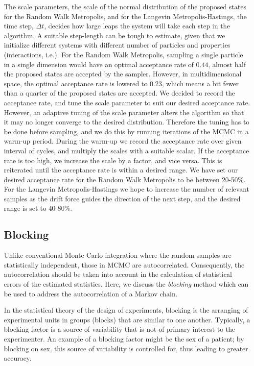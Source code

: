 The scale parameters, the scale of the normal distribution of the proposed states for the Random Walk Metropolis, and for the Langevin Metropolis-Hastings, the time step, $\Delta t$, decides how large leaps the system will take each step in the algorithm. A suitable step-length can be tough to estimate, given that we initialize different systems with different number of particles and properties (interactions, i.e.). For the Random Walk Metropolis, sampling a single particle in a single dimension would have an optimal acceptance rate of $0.44$, almost half the proposed states are accepted by the sampler. However, in multidimensional space, the optimal acceptance rate is lowered to $0.23$, which means a bit fewer than a quarter of the proposed states are accepted. We decided to record the acceptance rate, and tune the scale parameter to suit our desired acceptance rate. However, an adaptive tuning of the scale parameter alters the algorithm so that it may no longer converge to the desired distribution. Therefore the tuning has to be done before sampling, and we do this by running iterations of the MCMC in a warm-up period. During the warm-up we record the acceptance rate over given interval of cycles, and multiply the scales with a suitable scalar. If the acceptance rate is too high, we increase the scale by a factor, and vice versa. This is reiterated until the acceptance rate is within a desired range. We have set our desired acceptance rate for the Random Walk Metropolis to be between 20-50\%. For the Langevin Metropolis-Hastings we hope to increase the number of relevant samples as the drift force guides the direction of the next step, and the desired range is set to 40-80\%.


\subsection{Blocking}\label{sec:blocking}

Unlike conventional Monte Carlo integration where the random samples are statistically independent, those in MCMC are autocorrelated. Consequently, the autocorrelation should be taken into account in the calculation of statistical errors of the estimated statistics. Here, we discuss the \textit{blocking} method which can be used to address the autocorrelation of a Markov chain.   

In the statistical theory of the design of experiments, blocking is the arranging of experimental units in groups (blocks) that are similar to one another. Typically, a blocking factor is a source of variability that is not of primary interest to the experimenter. An example of a blocking factor might be the sex of a patient; by blocking on sex, this source of variability is controlled for, thus leading to greater accuracy.

